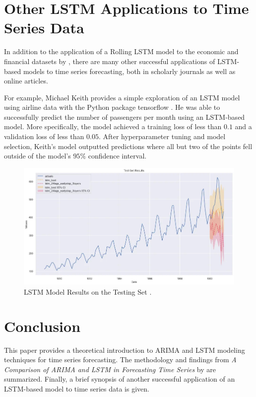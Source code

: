 \documentclass[twoside,11pt]{article}
\begin{document}
\section{Other LSTM Applications to Time Series Data}
In addition to the application of a Rolling LSTM model to the economic and financial datasets by \cite{siami-namini:2018}, there are many other successful applications of LSTM-based models to time series forecasting, both in scholarly journals as well as online articles.

For example, Michael Keith provides a simple exploration of an LSTM model using airline data with the Python package tensorflow \citep{keith}. He was able to successfully predict the number of passengers per month using an LSTM-based model. More specifically, the model achieved a training loss of less than $0.1$ and a validation loss of less than $0.05$. After hyperparameter tuning and model selection, Keith's model outputted predictions where all but two of the points fell outside of the model's $95\%$ confidence interval.

\begin{figure}
    \centering
    \includegraphics[scale=0.45]{img/keith.jpeg}
    \caption{LSTM Model Results on the Testing Set \citep{keith}.}
    \label{fig:keith}
\end{figure}

\section{Conclusion}
This paper provides a theoretical introduction to ARIMA and LSTM modeling techniques for time series forecasting. The methodology and findings from \textit{A Comparison of ARIMA and LSTM in Forecasting Time Series} by \cite{siami-namini:2018} are summarized. Finally, a brief synopsis of another successful application of an LSTM-based model to time series data is given.

\vskip 0.2in

\end{document}
